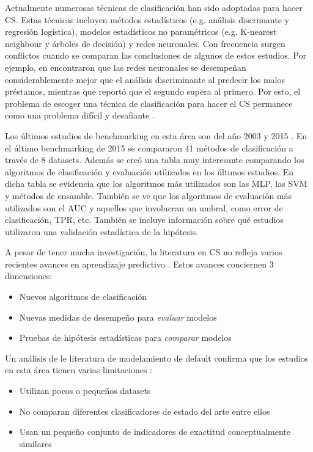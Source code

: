 Actualmente numerosas técnicas de clasificación han sido adoptadas para hacer \ac{CS}. Estas técnicas incluyen métodos estadísticos (e.g. análisis discrimante y regresión logística), modelos estadísticos no paramétricos (e.g. K-nearest neighbour y árboles de decisión) y redes neuronales. Con frecuencia surgen conflictos cuando se comparan las conclusiones de algunos de estos estudios. Por ejemplo, en \cite{desai1996comparison} encontraron que las redes neuronales se desempeñan considerablemente mejor que el análisis discriminante al predecir los malos préstamos, mientras que \cite{yobas2000credit} reportó que el segundo supera al primero. Por esto, el problema de escoger una técnica de clasificación para hacer el \ac{CS} permanece como una problema difícil y desafiante \cite{baesens2003benchmarking}.

Los últimos estudios de benchmarking en esta área son del año 2003 \cite{baesens2003benchmarking} y 2015 \cite{lessmann2015benchmarking}. En el último benchmarking de 2015 se compararon 41 métodos de clasificación a través de 8 datasets. Además se creó una tabla muy interesante comparando los algoritmos de clasificación y evaluación utilizados en los últimos estudios. En dicha tabla se evidencia que los algoritmos más utilizados son las \ac{MLP}, las \ac{SVM} y métodos de ensamble. También se ve que los algoritmos de evaluación más utilizados son el \ac{AUC} y aquellos que involucran un umbral, como error de clasificación, \ac{TPR}, etc. También se incluye información sobre qué estudios utilizaron una validación estadística de la hipótesis.

A pesar de tener mucha investigación, la literatura en \ac{CS} no refleja varios recientes avances en aprendizaje predictivo \cite{lessmann2015benchmarking}. Estos avances conciernen 3 dimensiones:

\begin{itemize}
    \item Nuevos algoritmos de clasificación
    \item Nuevas medidas de desempeño para \textit{evaluar} modelos
    \item Pruebas de hipótesis estadísticas para \textit{comparar} modelos 
\end{itemize}

Un análisis de le literatura de modelamiento de default confirma que los estudios en esta área tienen varias limitaciones \cite{lessmann2015benchmarking}:

\begin{itemize}
    \item Utilizan pocos o pequeños datasets
    \item No comparan diferentes clasificadores de estado del arte entre ellos
    \item Usan un pequeño conjunto de indicadores de exactitud conceptualmente similares
\end{itemize}

